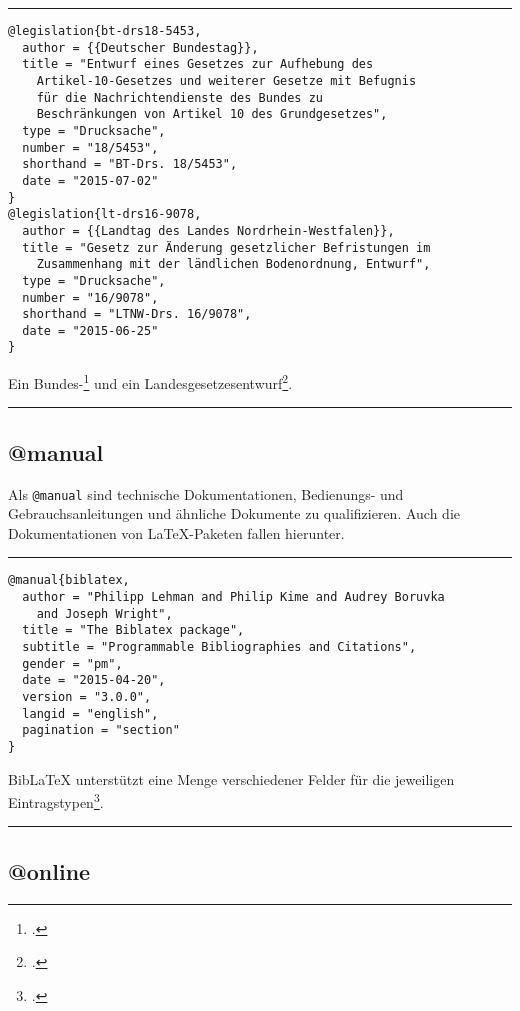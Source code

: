 \documentclass[11pt,a4paper,DIV=calc]{scrartcl}
\newcommand\software[1]{\textsf{#1}}
\newcommand\Biblatex{\software{Bib\LaTeX{}}\xspace}
\newenvironment{rubexample}{\par\vspace{\baselineskip}\hrule\par\begin{refsection}}{\end{refsection}\par\hrule\par\vspace{\baselineskip}}
\begin{document}
\begin{rubexample}
\begin{verbatim}
@legislation{bt-drs18-5453,
  author = {{Deutscher Bundestag}},
  title = "Entwurf eines Gesetzes zur Aufhebung des
    Artikel-10-Gesetzes und weiterer Gesetze mit Befugnis
    für die Nachrichtendienste des Bundes zu
    Beschränkungen von Artikel 10 des Grundgesetzes",
  type = "Drucksache",
  number = "18/5453",
  shorthand = "BT-Drs. 18/5453",
  date = "2015-07-02"
}
@legislation{lt-drs16-9078,
  author = {{Landtag des Landes Nordrhein-Westfalen}},
  title = "Gesetz zur Änderung gesetzlicher Befristungen im
    Zusammenhang mit der ländlichen Bodenordnung, Entwurf",
  type = "Drucksache",
  number = "16/9078",
  shorthand = "LTNW-Drs. 16/9078",
  date = "2015-06-25"
}
\end{verbatim}

Ein Bundes-\footcite{bt-drs18-5453} und ein
Landesgesetzesentwurf\footcite[9]{lt-drs16-9078}.

\printbibliography
\end{rubexample}

\subsection{@manual}

Als \verb+@manual+ sind technische Dokumentationen,
Bedienungs- und Gebrauchsanleitungen und ähnliche Dokumente zu
qualifizieren. Auch die Dokumentationen von \LaTeX{}-Pa\-ke\-ten
fallen hierunter.

\begin{rubexample}
\begin{verbatim}
@manual{biblatex,
  author = "Philipp Lehman and Philip Kime and Audrey Boruvka
    and Joseph Wright",
  title = "The Biblatex package",
  subtitle = "Programmable Bibliographies and Citations",
  gender = "pm",
  date = "2015-04-20",
  version = "3.0.0",
  langid = "english",
  pagination = "section"
}
\end{verbatim}

\Biblatex unterstützt eine Menge verschiedener Felder für die
jeweiligen Eintragstypen\footcite[2.2.2]{biblatex}.

\printbibliography
\end{rubexample}

\subsection{@online}
\end{document}
